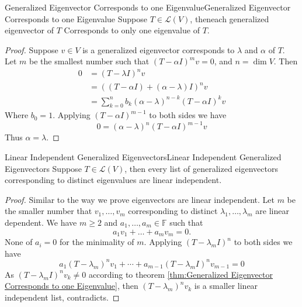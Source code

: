 \documentclass[../main.tex]{subfiles}
\begin{document}
\begin{theorem}{Generalized Eigenvector Corresponds to one Eigenvalue}{Generalized Eigenvector Corresponds to one Eigenvalue}
Suppose $T\in \mathscr{L}(V)$, theneach generalized eigenvector of $T$ Corresponds to only one eigenvalue of $T$.
\end{theorem}
\begin{proof}
Suppose $v\in V$ is a generalized eigenvector corresponds to $\lambda$ and $\alpha$ of $T$. Let $m$ be the smallest number such that $(T-\alpha I)^mv=0$, and $n=\dim V$. Then
\begin{equation*}
\begin{aligned}
	0 &= (T-\lambda I)^nv\\
	  &=\left((T-\alpha I) + (\alpha-\lambda)I\right)^nv\\
	  &=\sum_{k=0}^{n} b_k (\alpha-\lambda)^{n-k}(T-\alpha I)^kv
\end{aligned}
\end{equation*}
Where $b_0=1$. Applying $(T-\alpha I)^{m-1}$ to both sides we have
\begin{equation*}
0 = (\alpha-\lambda)^n(T-\alpha I)^{m-1}v
\end{equation*}
Thus $\alpha=\lambda$.
\end{proof}

\begin{theorem}{Linear Independent Generalized Eigenvectors}{Linear Independent Generalized Eigenvectors}
Suppose $T\in \mathscr{L}(V)$, then every list of generalized eigenvectors corresponding to distinct eigenvalues are linear independent.
\end{theorem}
\begin{proof}
Similar to the way we prove eigenvectors are linear independent. Let $m$ be the smaller number that $v_1, \ldots ,v_m$ corresponding to distinct $\lambda_1, \ldots ,\lambda_m$ are linear dependent. We have $m \geq 2$ and $a_1, \ldots ,a_m\in \mathbb{F}$ such that
\begin{equation*}
a_1v_1 +\ldots +a_mv_m=0.
\end{equation*}
None of $a_i=0$ for the minimality of $m$. Applying $(T-\lambda_m I)^n$ to both sides we have
\begin{equation*}
a_1(T-\lambda_m)^nv_1+\cdots + a _{m-1}(T-\lambda_m I)^n v_{m-1} = 0
\end{equation*}
As $(T-\lambda_m I)^n v_k \neq 0$ according to theorem \ref{thm:Generalized Eigenvector Corresponds to one Eigenvalue}, then $(T-\lambda_m)^n v_k$ is a smaller linear independent list, contradicts.
\end{proof}
\end{document}
